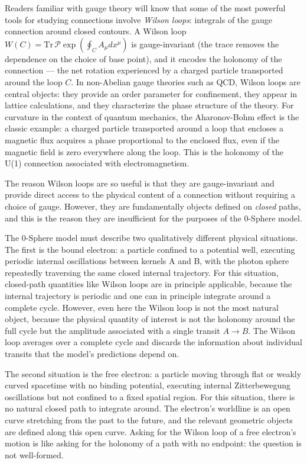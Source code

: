 \documentclass[%
 reprint,
 amsmath,amssymb,
 aps,
 prb,
]{revtex4-2}
\numberwithin{equation}{section}
\begin{document}
Readers familiar with gauge theory will know that some of the most powerful tools for studying connections involve \emph{Wilson loops}: integrals of the gauge connection around closed contours. A Wilson loop $W(C) = \mathrm{Tr}\,\mathcal{P}\exp\!\left(\oint_C A_\mu dx^\mu\right)$ is gauge-invariant (the trace removes the dependence on the choice of base point), and it encodes the holonomy of the connection --- the net rotation experienced by a charged particle transported around the loop $C$. In non-Abelian gauge theories such as QCD, Wilson loops are central objects: they provide an order parameter for confinement, they appear in lattice calculations, and they characterize the phase structure of the theory. For curvature in the context of quantum mechanics, the Aharonov-Bohm effect is the classic example: a charged particle transported around a loop that encloses a magnetic flux acquires a phase proportional to the enclosed flux, even if the magnetic field is zero everywhere along the loop. This is the holonomy of the U(1) connection associated with electromagnetism.

The reason Wilson loops are so useful is that they are gauge-invariant and provide direct access to the physical content of a connection without requiring a choice of gauge. However, they are fundamentally objects defined on \emph{closed} paths, and this is the reason they are insufficient for the purposes of the 0-Sphere model.

The 0-Sphere model must describe two qualitatively different physical situations. The first is the bound electron: a particle confined to a potential well, executing periodic internal oscillations between kernels A and B, with the photon sphere repeatedly traversing the same closed internal trajectory. For this situation, closed-path quantities like Wilson loops are in principle applicable, because the internal trajectory is periodic and one can in principle integrate around a complete cycle. However, even here the Wilson loop is not the most natural object, because the physical quantity of interest is not the holonomy around the full cycle but the amplitude associated with a single transit $A\to B$. The Wilson loop averages over a complete cycle and discards the information about individual transits that the model's predictions depend on.

The second situation is the free electron: a particle moving through flat or weakly curved spacetime with no binding potential, executing internal Zitterbewegung oscillations but not confined to a fixed spatial region. For this situation, there is no natural closed path to integrate around. The electron's worldline is an open curve stretching from the past to the future, and the relevant geometric objects are defined along this open curve. Asking for the Wilson loop of a free electron's motion is like asking for the holonomy of a path with no endpoint: the question is not well-formed.
\end{document}
